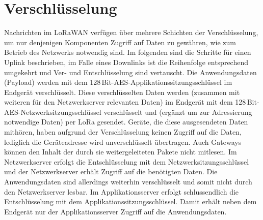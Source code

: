 \section{Verschlüsselung}
Nachrichten im LoRaWAN verfügen über mehrere Schichten der Verschlüsselung, um nur denjenigen Komponenten Zugriff auf Daten zu gewähren, wie zum Betrieb des Netzwerks notwendig sind.
Im folgenden sind die Schritte für einen Uplink beschrieben, im Falle eines Downlinks ist die Reihenfolge entsprechend umgekehrt und Ver- und Entschlüsselung sind vertauscht.
Die Anwendungsdaten (\gls{Payload}) werden mit dem 128\,Bit-AES-Applikationssitzungsschlüssel im Endgerät verschlüsselt.
Diese verschlüsselten Daten werden (zusammen mit weiteren für den Netzwerkserver relevanten Daten) im Endgerät mit dem 128\,Bit-AES-Netzwerksitzungsschlüssel verschlüsselt und (ergänzt um zur Adressierung notwendige Daten) per LoRa gesendet.
Geräte, die diese ausgesendeten Daten mithören, haben aufgrund der Verschlüsselung keinen Zugriff auf die Daten, lediglich die Geräteadresse wird unverschlüsselt übertragen.
Auch Gateways können den Inhalt der durch sie weitergeleiteten Pakete nicht mitlesen.
Im Netzwerkserver erfolgt die Entschlüsselung mit dem Netzwerksitzungsschlüssel und der Netzwerkserver erhält Zugriff auf die benötigten Daten.
Die Anwendungsdaten sind allerdings weiterhin verschlüsselt und somit nicht durch den Netzwerkserver lesbar.
Im Applikationsserver erfolgt schlussendlich die Entschlüsselung mit dem Applikationssitzungsschlüssel.
Damit erhält neben dem Endgerät nur der Applikationsserver Zugriff auf die Anwendungsdaten.



